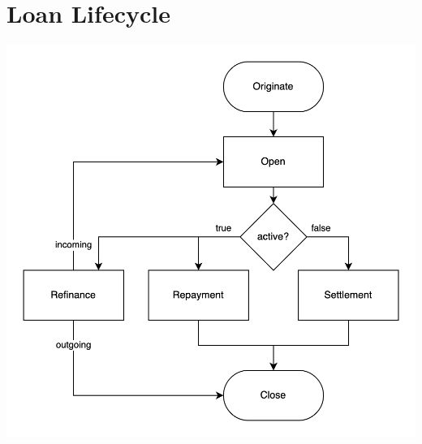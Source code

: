 \documentclass[12pt]{article}
\begin{document}
\section{Loan Lifecycle}
\includegraphics[width=\textwidth]{loan_lifecycle.png}
\end{document}

